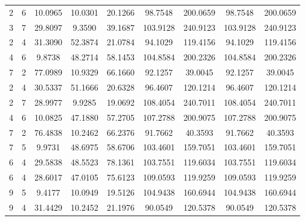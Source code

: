 \documentclass[withoutpreface,bwprint]{cumcmthesis}
\begin{document}
\begin{appendices}
\begin{table}[htbp!]
\begin{tabular}{@{}ccccccccc@{}}
				2              & 6              & 10.0965     & 10.0301     & 20.1266     & 98.7548         & 200.0659        & 98.7548         & 200.0659        \\
				3              & 7              & 29.8097     & 9.3590      & 39.1687     & 103.9128        & 240.9123        & 103.9128        & 240.9123        \\
				2              & 4              & 31.3090     & 52.3874     & 21.0784     & 94.1029         & 119.4156        & 94.1029         & 119.4156        \\
				4              & 6              & 9.8738      & 48.2714     & 58.1453     & 104.8584        & 200.2326        & 104.8584        & 200.2326        \\
				7              & 2              & 77.0989     & 10.9329     & 66.1660     & 92.1257         & 39.0045         & 92.1257         & 39.0045         \\
				2              & 4              & 30.5337     & 51.1666     & 20.6328     & 96.4607         & 120.1214        & 96.4607         & 120.1214        \\
				2              & 7              & 28.9977     & 9.9285      & 19.0692     & 108.4054        & 240.7011        & 108.4054        & 240.7011        \\
				4              & 6              & 10.0825     & 47.1880     & 57.2705     & 107.2788        & 200.9075        & 107.2788        & 200.9075        \\
				7              & 2              & 76.4838     & 10.2462     & 66.2376     & 91.7662         & 40.3593         & 91.7662         & 40.3593         \\
				7              & 5              & 9.9731      & 48.6975     & 58.6706     & 103.4601        & 159.7051        & 103.4601        & 159.7051        \\
				6              & 4              & 29.5838     & 48.5523     & 78.1361     & 103.7551        & 119.6034        & 103.7551        & 119.6034        \\
				6              & 4              & 28.6017     & 47.0105     & 75.6123     & 109.0593        & 119.9259        & 109.0593        & 119.9259        \\
				9              & 5              & 9.4177      & 10.0949     & 19.5126     & 104.9438        & 160.6944        & 104.9438        & 160.6944        \\
				9              & 4              & 31.4429     & 10.2452     & 21.1976     & 90.0549         & 120.5378        & 90.0549         & 120.5378        \\

\end{tabular}
\end{table}
\end{appendices}
\end{document}

